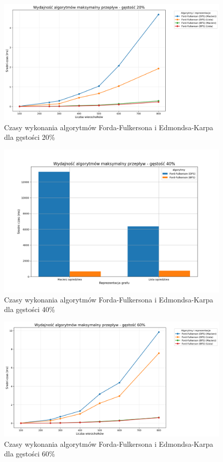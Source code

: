 \documentclass{article}
\begin{document}
\begin{figure}[H]
    \centering
    \includegraphics[scale=0.5]{../Python/charts_type2/Typ2_MAX_FLOW_gestosc20_wykres.png}
    \caption{Czasy wykonania algorytmów Forda-Fulkersona i Edmondsa-Karpa dla gęstości 20\%}
\end{figure}
\begin{figure}[H]
    \centering
    \includegraphics[scale=0.5]{../Python/charts_type2/Typ2_MAX_FLOW_gestosc40_wykres.png}
    \caption{Czasy wykonania algorytmów Forda-Fulkersona i Edmondsa-Karpa dla gęstości 40\%}
\end{figure}

\begin{figure}[H]
    \centering
    \includegraphics[scale=0.5]{../Python/charts_type2/Typ2_MAX_FLOW_gestosc60_wykres.png}
    \caption{Czasy wykonania algorytmów Forda-Fulkersona i Edmondsa-Karpa dla gęstości 60\%}
\end{figure}
\end{document}
